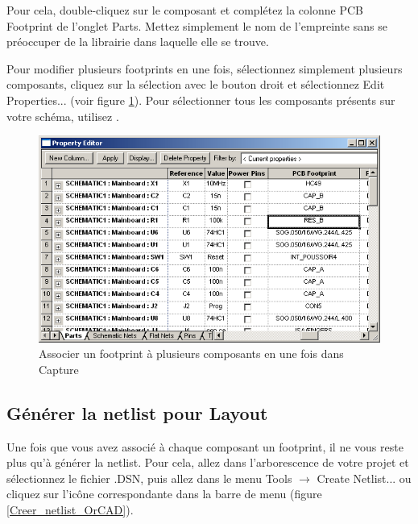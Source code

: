 \documentclass[a4paper]{article}
\begin{document}
Pour cela, double-cliquez sur le composant et complétez la colonne \og{}PCB Footprint\fg{} de l'onglet \og{}Parts\fg{}. Mettez simplement le nom de l'empreinte sans se préoccuper de la librairie dans laquelle elle se trouve.

Pour modifier plusieurs footprints en une fois, sélectionnez simplement plusieurs composants, cliquez sur la sélection avec le bouton droit et sélectionnez \og{}Edit Properties...\fg{} (voir figure \ref{Associer_footprint_composants}). Pour sélectionner tous les composants présents sur votre schéma, utilisez \Ctrl{}.

\begin{figure}[H]
	\centering
	\includegraphics[scale=0.75]{Images/Associer_footprint_composants.png}
	\caption{Associer un footprint à plusieurs composants en une fois dans Capture
		\label{Associer_footprint_composants}}
\end{figure}

\subsection{Générer la netlist pour Layout}

Une fois que vous avez associé à chaque composant un footprint, il ne vous reste plus qu'à générer la netlist. Pour cela, allez dans l'arborescence de votre projet et sélectionnez le fichier \og{}.DSN\fg{}, puis allez dans le menu \og{}Tools\fg{} $\rightarrow$ \og{}Create Netlist...\fg{} ou cliquez sur l'icône correspondante dans la barre de menu (figure \ref{Creer_netlist_OrCAD}).
\end{document}
